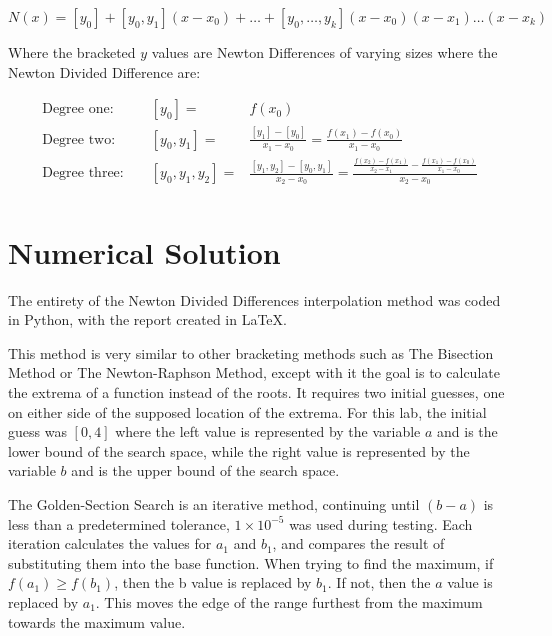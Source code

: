 \documentclass[12pt, letterpaper]{article}
\begin{document}
	 \begin{equation}N(x)=[y_0]+[y_0, y_1](x-x_0)+\ldots+[y_0, \ldots, y_k](x-x_0)(x-x_1)\ldots(x-x_k)\end{equation}
	 
	 Where the bracketed $y$ values are Newton Differences of varying sizes where the Newton Divided Difference are:
	 
	 \begin{align*}
	 	\text{Degree one: } && [y_0] = & f(x_0) \\
		\text{Degree two: } && [y_0, y_1] = & \frac{[y_1]-[y_0]}{x_1-x_0} = \frac{f(x_1)-f(x_0)}{x_1-x_0} \\
		\text{Degree three: } && [y_0, y_1, y_2] = & \frac{[y_1, y_2] - [y_0, y_1]}{x_2-x_0} = \frac{\frac{f(x_2)-f(x_1)}{x_2-x_1} - \frac{f(x_1)-f(x_0)}{x_1-x_0}}{x_2-x_0} \\
	\end{align*}
	
	

	 
\section{\label{solution}Numerical Solution}
	The entirety of the Newton Divided Differences interpolation method was coded in Python, with the report created in \LaTeX{}.
	
	This method is very similar to other bracketing methods such as The Bisection Method or The Newton-Raphson Method, except with it the goal is to calculate the extrema of a function instead of the roots. It requires two initial guesses, one on either side of the supposed location of the extrema. For this lab, the initial guess was $[0, 4]$ where the left value is represented by the variable $a$ and is the lower bound of the search space, while the right value is represented by the variable $b$ and is the upper bound of the search space.
	
	The Golden-Section Search is an iterative method, continuing until $(b-a)$ is less than a predetermined tolerance, $1\times10^{-5}$ was used during testing. Each iteration calculates the values for $a_1$ and $b_1$, and compares the result of substituting them into the base function. When trying to find the maximum, if $f(a_1)\geq f(b_1)$, then the b value is replaced by $b_1$. If not, then the $a$ value is replaced by $a_1$. This moves the edge of the range furthest from the maximum towards the maximum value.
	
\end{document}
